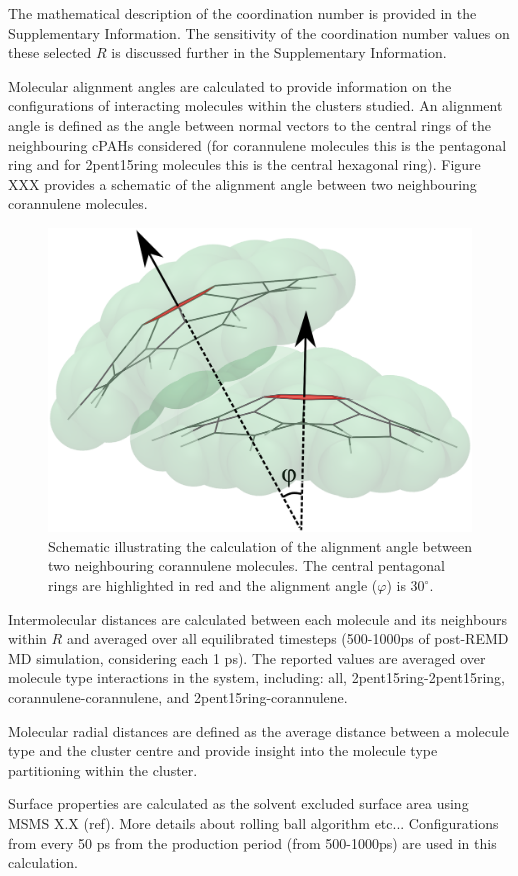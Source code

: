  
The mathematical description of the coordination number is provided in the Supplementary Information.
The sensitivity of the coordination number values on these selected $R$ is discussed further in the Supplementary Information.


Molecular alignment angles are calculated to provide information on the configurations of interacting molecules within the clusters studied.  An alignment angle is defined as the angle between normal vectors to the central rings of the neighbouring cPAHs considered (for corannulene molecules this is the pentagonal ring and for 2pent15ring molecules this is the central hexagonal ring).  Figure XXX provides a schematic of the alignment angle between two neighbouring corannulene molecules.
%
\begin{figure}[!tbh]
\centering
\includegraphics[width=0.25\linewidth]{Figures/alignment_angle_schematic.eps}
\caption{Schematic illustrating the calculation of the alignment angle between two neighbouring corannulene molecules. The central pentagonal rings are highlighted in red and the alignment angle ($\varphi$) is $30^{\circ}$.}
\label{fig:alignmentangle_schematic}
\end{figure}
 

Intermolecular distances are calculated between each molecule and its neighbours within $R$ and averaged over all equilibrated timesteps (500-1000ps of post-REMD MD simulation, considering each 1 ps).  The reported values are averaged over molecule type interactions in the system, including: all, 2pent15ring-2pent15ring, corannulene-corannulene, and 2pent15ring-corannulene.

Molecular radial distances are defined as the average distance between a molecule type and the cluster centre and provide insight into the molecule type partitioning within the cluster.

Surface properties are calculated as the solvent excluded surface area using MSMS X.X (ref). More details about rolling ball algorithm etc...
Configurations from every 50 ps from the production period (from 500-1000ps) are used in this calculation.


